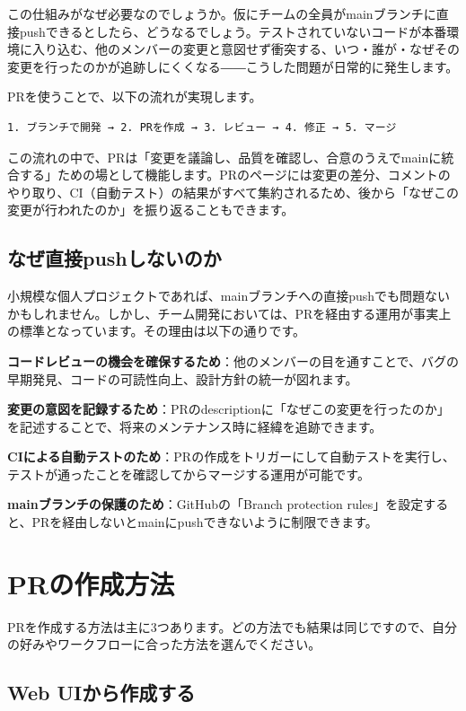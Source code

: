 この仕組みがなぜ必要なのでしょうか。仮にチームの全員がmainブランチに直接pushできるとしたら、どうなるでしょう。テストされていないコードが本番環境に入り込む、他のメンバーの変更と意図せず衝突する、いつ・誰が・なぜその変更を行ったのかが追跡しにくくなる――こうした問題が日常的に発生します。

PRを使うことで、以下の流れが実現します。

\begin{lstlisting}[language={}]
1. ブランチで開発 → 2. PRを作成 → 3. レビュー → 4. 修正 → 5. マージ
\end{lstlisting}

この流れの中で、PRは「変更を議論し、品質を確認し、合意のうえでmainに統合する」ための場として機能します。PRのページには変更の差分、コメントのやり取り、CI（自動テスト）の結果がすべて集約されるため、後から「なぜこの変更が行われたのか」を振り返ることもできます。

\subsection{なぜ直接pushしないのか}

小規模な個人プロジェクトであれば、mainブランチへの直接pushでも問題ないかもしれません。しかし、チーム開発においては、PRを経由する運用が事実上の標準となっています。その理由は以下の通りです。

\textbf{コードレビューの機会を確保するため}：他のメンバーの目を通すことで、バグの早期発見、コードの可読性向上、設計方針の統一が図れます。

\textbf{変更の意図を記録するため}：PRのdescriptionに「なぜこの変更を行ったのか」を記述することで、将来のメンテナンス時に経緯を追跡できます。

\textbf{CIによる自動テストのため}：PRの作成をトリガーにして自動テストを実行し、テストが通ったことを確認してからマージする運用が可能です。

\textbf{mainブランチの保護のため}：GitHubの「Branch protection rules」を設定すると、PRを経由しないとmainにpushできないように制限できます。

\section{PRの作成方法}

PRを作成する方法は主に3つあります。どの方法でも結果は同じですので、自分の好みやワークフローに合った方法を選んでください。

\subsection{Web UIから作成する}

